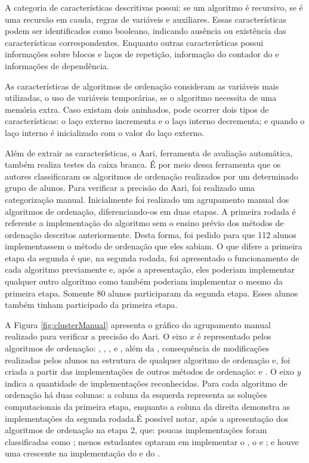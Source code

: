 	    A categoria de características descritivas possui: se um algoritmo é
	    recursivo, se é uma recursão em cauda, regras de variáveis e 
	    auxiliares. Essas características podem ser identificados como booleano,
	    indicando ausência ou existência das características correspondentes. Enquanto
	    outras características possui informações sobre blocos e laços de repetição,
	    informação do contador do  e informações de dependência.
	    
	    As características de algoritmos de ordenação consideram as variáveis mais
	    utilizadas, o uso de variáveis temporárias, se o algoritmo necessita de uma
	    memória extra. Caso existam dois  aninhados, pode ocorrer
	    dois tipos de características: o laço externo incrementa e o laço interno
	    decrementa; e quando o laço interno é inicializado com o valor do laço externo. 
	    
	    Além de extrair as características, o Aari, ferramenta de avaliação automática,
	    também realiza testes da caixa branca. É por meio dessa ferramenta que os
	    autores classificaram os algoritmos de ordenação realizados por um determinado
	    grupo de alunos. Para verificar a precisão do Aari, foi realizado uma
	    categorização manual. Inicialmente foi realizado um agrupamento manual dos
		algoritmos de ordenação, diferenciando-os em duas etapas. A primeira rodada
		é referente a implementação do algoritmo sem o ensino prévio dos métodos de
		ordenação descritos anteriormente. Desta forma, foi pedido para que 112
		alunos implementassem o método de ordenação que eles sabiam. O que difere
		a primeira etapa da segunda é que, na segunda rodada, foi apresentado o
		funcionamento de cada algoritmo previamente e, após a apresentação, eles
		poderiam implementar qualquer outro algoritmo como também poderiam
		implementar o mesmo da primeira etapa. Somente 80 alunos participaram
		da segunda etapa. Esses alunos também tinham participado da primeira etapa. 
		
		A Figura \ref{fig:clusterManual} apresenta o gráfico do agrupamento manual
		realizado para verificar a precisão do Aari. O eixo $x$ é representado pelos
		algoritmos de ordenação: , ,
		,  e , além
		da , consequência de modificações realizadas
		pelos alunos na estrutura de qualquer algoritmo de ordenação e, 
		foi criada a partir das implementações de outros métodos de ordenação: 
		 e . O eixo $y$ indica a quantidade de implementações
		reconhecidas. Para cada algoritmo de ordenação há duas colunas: a coluna da
		esquerda representa as soluções computacionais da primeira etapa, enquanto a
		coluna da direita demonstra as implementações da segunda rodada.É  possível notar,
		após a apresentação dos algoritmos de ordenação na etapa 2, que: poucas
		implementações foram classificadas como ; menos
		estudantes optaram em implementar o , o  e ; e houve uma crescente na implementação do  e do .
	    
